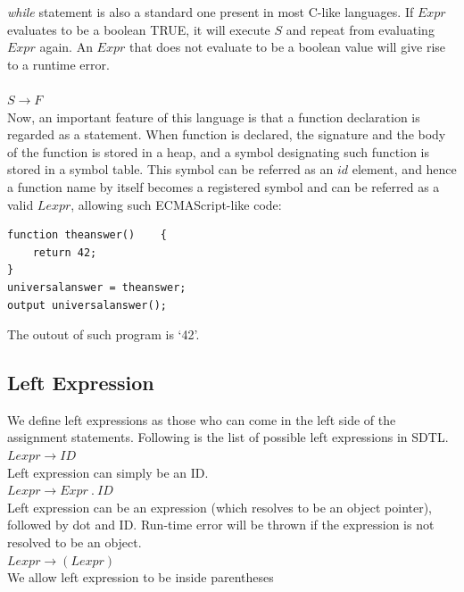 \documentclass[a4paper,12pt]{article}
\begin{document}
\textit{while} statement is also a standard one present in most C-like languages. If $Expr$ evaluates to be a boolean TRUE, it will execute $S$ and repeat from evaluating $Expr$ again. An $Expr$ that does not evaluate to be a boolean value will give rise to a runtime error.\\\\
$S \rightarrow F$\\
Now, an important feature of this language is that a function declaration is regarded as a statement. When function is declared, the signature and the body of the function is stored in a heap, and a symbol designating such function is stored in a symbol table. This symbol can be referred as an $id$ element, and hence a function name by itself becomes a registered symbol and can be referred as a valid $Lexpr$, allowing such ECMAScript-like code:\\
\medskip
\begin{lstlisting}[caption=Function declaration as a statement]
function theanswer()	{
	return 42;
}
universalanswer = theanswer;
output universalanswer();
\end{lstlisting}
The outout of such program is `42'.
\subsection{Left Expression}
We define left expressions as those who can come in the left side of the assignment statements. Following is the list of possible left expressions in SDTL.\\
$Lexpr \rightarrow ID$\\
Left expression can simply be an ID.\\
$Lexpr \rightarrow Expr\ .\ ID$\\
Left expression can be an expression (which resolves to be an object pointer), followed by dot and ID. Run-time error will be thrown if the expression is not resolved to be an object.\\
$Lexpr \rightarrow (Lexpr)$\\
We allow left expression to be inside parentheses\\
\end{document}
